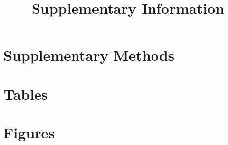 \UseRawInputEncoding









\begin{frontmatter}
    \title{Supplementary Information}
	
\end{frontmatter}



\section{Supplementary Methods}




\clearpage
\section*{Tables}
\label{tables}


\clearpage
\section*{Figures}
\label{figures}







